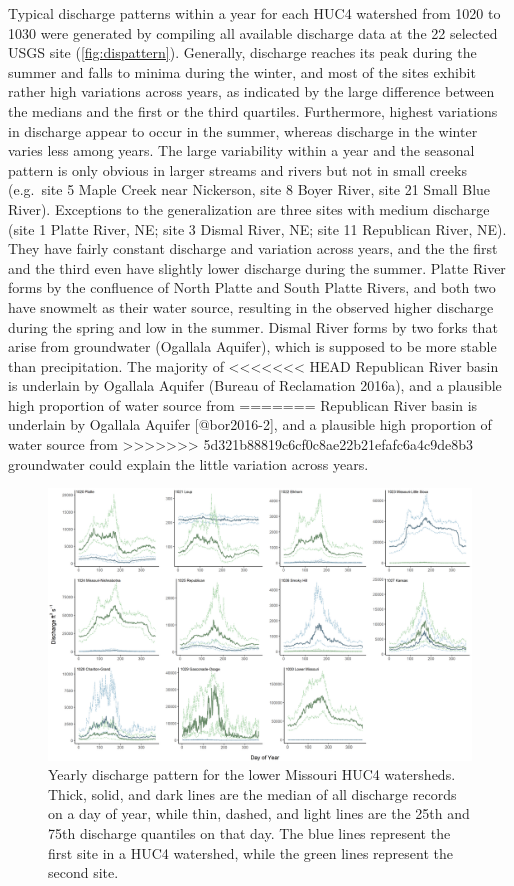 \documentclass[12pt,]{article}
\makeatletter
\def\maxwidth{\ifdim\Gin@nat@width>\linewidth\linewidth\else\Gin@nat@width\fi}
\makeatother
\begin{document}
Typical discharge patterns within a year for each HUC4 watershed from
1020 to 1030 were generated by compiling all available discharge data at
the 22 selected USGS site (\autoref{fig:dispattern}). Generally,
discharge reaches its peak during the summer and falls to minima during
the winter, and most of the sites exhibit rather high variations across
years, as indicated by the large difference between the medians and the
first or the third quartiles. Furthermore, highest variations in
discharge appear to occur in the summer, whereas discharge in the winter
varies less among years. The large variability within a year and the
seasonal pattern is only obvious in larger streams and rivers but not in
small creeks (e.g.~site 5 Maple Creek near Nickerson, site 8 Boyer
River, site 21 Small Blue River). Exceptions to the generalization are
three sites with medium discharge (site 1 Platte River, NE; site 3
Dismal River, NE; site 11 Republican River, NE). They have fairly
constant discharge and variation across years, and the the first and the
third even have slightly lower discharge during the summer. Platte River
forms by the confluence of North Platte and South Platte Rivers, and
both two have snowmelt as their water source, resulting in the observed
higher discharge during the spring and low in the summer. Dismal River
forms by two forks that arise from groundwater (Ogallala Aquifer), which
is supposed to be more stable than precipitation. The majority of
<<<<<<< HEAD
Republican River basin is underlain by Ogallala Aquifer (Bureau of
Reclamation 2016a), and a plausible high proportion of water source from
=======
Republican River basin is underlain by Ogallala Aquifer
{[}@bor2016-2{]}, and a plausible high proportion of water source from
>>>>>>> 5d321b88819c6cf0c8ae22b21efafc6a4c9de8b3
groundwater could explain the little variation across years.

\begin{figure}[H]
\includegraphics[width=\maxwidth]{../Figures/discharge} \caption{\label{fig:dispattern}Yearly discharge pattern for the lower Missouri HUC4 watersheds. Thick, solid, and dark lines are the median of all discharge records on a day of year, while thin, dashed, and light lines are the 25th and 75th discharge quantiles on that day. The blue lines represent the first site in a HUC4 watershed, while the green lines represent the second site.}\label{fig:dispattern}
\end{figure}
\end{document}
